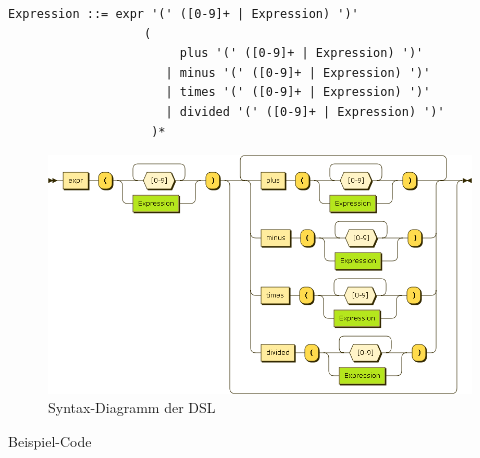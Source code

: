 \begin{lstlisting}[caption={Grammatik der Expression-DSL, spezifiziert in EBNF},label=lst:grammar]
	Expression ::= expr '(' ([0-9]+ | Expression) ')'
	               (
	                    plus '(' ([0-9]+ | Expression) ')'
	                  | minus '(' ([0-9]+ | Expression) ')'
	                  | times '(' ([0-9]+ | Expression) ')'
	                  | divided '(' ([0-9]+ | Expression) ')'
	                )*
\end{lstlisting}

\begin{figure}[H]
\centering\includegraphics[width=.8\textwidth]{images/kapitel4/expressionRailroad.png}
\caption{Syntax-Diagramm der DSL}
\label{fig:railroad}
\end{figure}

Beispiel-Code

